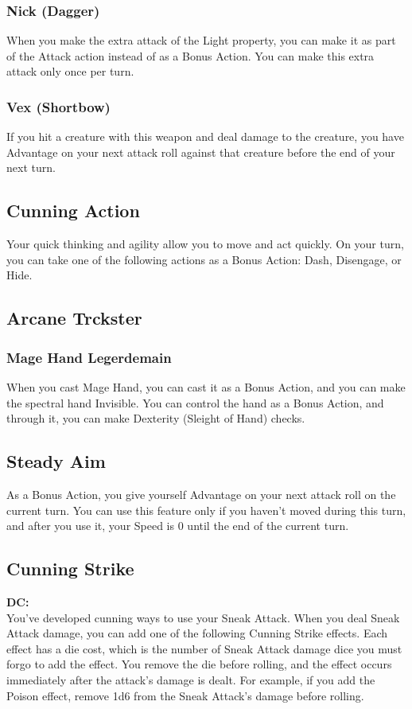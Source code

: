 \documentclass[letterpaper,openany,oneside,twocolumn]{book}
\begin{document}
\subsubsection*{Nick (Dagger)}
When you make the extra attack of the Light property, you can make it as part of the Attack action instead of as a Bonus Action. You can make this extra attack only once per turn.
\subsubsection*{Vex (Shortbow)}
If you hit a creature with this weapon and deal damage to the creature, you have Advantage on your next attack roll against that creature before the end of your next turn.
\subsection*{Cunning Action}
Your quick thinking and agility allow you to move and act quickly. On your turn, you can take one of the following actions as a Bonus Action: Dash, Disengage, or Hide.
\subsection*{Arcane Trckster}
\subsubsection*{Mage Hand Legerdemain}
When you cast Mage Hand, you can cast it as a Bonus Action, and you can make the spectral hand Invisible. You can control the hand as a Bonus Action, and through it, you can make Dexterity (Sleight of Hand) checks.
\subsection*{Steady Aim}
As a Bonus Action, you give yourself Advantage on your next attack roll on the current turn. You can use this feature only if you haven't moved during this turn, and after you use it, your Speed is 0 until the end of the current turn.
\subsection*{Cunning Strike}
\textbf{DC: }\\
You've developed cunning ways to use your Sneak Attack. When you deal Sneak Attack damage, you can add one of the following Cunning Strike effects. Each effect has a die cost, which is the number of Sneak Attack damage dice you must forgo to add the effect. You remove the die before rolling, and the effect occurs immediately after the attack's damage is dealt. For example, if you add the Poison effect, remove 1d6 from the Sneak Attack's damage before rolling.
\end{document}
